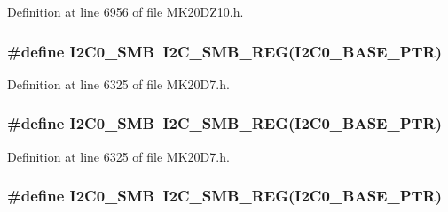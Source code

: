 Definition at line 6956 of file M\+K20\+D\+Z10.\+h.

\subsubsection[{\texorpdfstring{I2\+C0\+\_\+\+S\+MB}{I2C0_SMB}}]{\setlength{\rightskip}{0pt plus 5cm}\#define I2\+C0\+\_\+\+S\+MB~{\bf I2\+C\+\_\+\+S\+M\+B\+\_\+\+R\+EG}({\bf I2\+C0\+\_\+\+B\+A\+S\+E\+\_\+\+P\+TR})}\hypertarget{group___i2_c___register___accessor___macros_gaf27ba0a559fe4af8031d5de859d8ba47}{}\label{group___i2_c___register___accessor___macros_gaf27ba0a559fe4af8031d5de859d8ba47}


Definition at line 6325 of file M\+K20\+D7.\+h.

\subsubsection[{\texorpdfstring{I2\+C0\+\_\+\+S\+MB}{I2C0_SMB}}]{\setlength{\rightskip}{0pt plus 5cm}\#define I2\+C0\+\_\+\+S\+MB~{\bf I2\+C\+\_\+\+S\+M\+B\+\_\+\+R\+EG}({\bf I2\+C0\+\_\+\+B\+A\+S\+E\+\_\+\+P\+TR})}\hypertarget{group___i2_c___register___accessor___macros_gaf27ba0a559fe4af8031d5de859d8ba47}{}\label{group___i2_c___register___accessor___macros_gaf27ba0a559fe4af8031d5de859d8ba47}


Definition at line 6325 of file M\+K20\+D7.\+h.

\subsubsection[{\texorpdfstring{I2\+C0\+\_\+\+S\+MB}{I2C0_SMB}}]{\setlength{\rightskip}{0pt plus 5cm}\#define I2\+C0\+\_\+\+S\+MB~{\bf I2\+C\+\_\+\+S\+M\+B\+\_\+\+R\+EG}({\bf I2\+C0\+\_\+\+B\+A\+S\+E\+\_\+\+P\+TR})}\hypertarget{group___i2_c___register___accessor___macros_gaf27ba0a559fe4af8031d5de859d8ba47}{}\label{group___i2_c___register___accessor___macros_gaf27ba0a559fe4af8031d5de859d8ba47}


